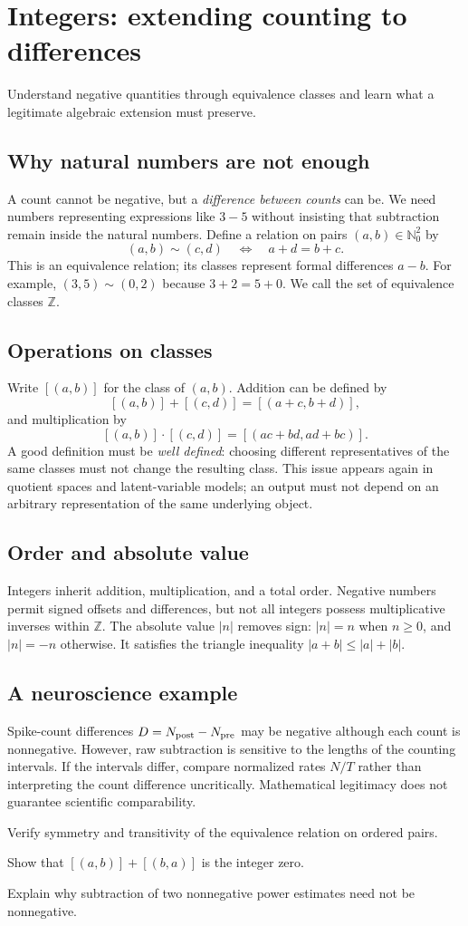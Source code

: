 \chapter{Integers: extending counting to differences}\label{ch:integers}
\begin{readergoal}Understand negative quantities through equivalence classes and learn what a legitimate algebraic extension must preserve.\end{readergoal}
\section{Why natural numbers are not enough}
A count cannot be negative, but a \emph{difference between counts} can be. We need numbers representing expressions like $3-5$ without insisting that subtraction remain inside the natural numbers. Define a relation on pairs $(a,b)\in\mathbb N_0^2$ by
\[(a,b)\sim(c,d)\quad\Longleftrightarrow\quad a+d=b+c.\]
This is an equivalence relation; its classes represent formal differences $a-b$. For example, $(3,5)\sim(0,2)$ because $3+2=5+0$. We call the set of equivalence classes $\mathbb Z$.

\section{Operations on classes}
Write $[(a,b)]$ for the class of $(a,b)$. Addition can be defined by
\[[(a,b)]+[(c,d)]=[(a+c,b+d)],\]
and multiplication by
\[[(a,b)]\cdot[(c,d)]=[(ac+bd,ad+bc)].\]
A good definition must be \emph{well defined}: choosing different representatives of the same classes must not change the resulting class. This issue appears again in quotient spaces and latent-variable models; an output must not depend on an arbitrary representation of the same underlying object.

\section{Order and absolute value}
Integers inherit addition, multiplication, and a total order. Negative numbers permit signed offsets and differences, but not all integers possess multiplicative inverses within $\mathbb Z$. The absolute value $|n|$ removes sign: $|n|=n$ when $n\ge0$, and $|n|=-n$ otherwise. It satisfies the triangle inequality $|a+b|\le|a|+|b|$.

\section{A neuroscience example}
Spike-count differences $D=N_{\rm post}-N_{\rm pre}$ may be negative although each count is nonnegative. However, raw subtraction is sensitive to the lengths of the counting intervals. If the intervals differ, compare normalized rates $N/T$ rather than interpreting the count difference uncritically. Mathematical legitimacy does not guarantee scientific comparability.

\begin{exercises}
\item Verify symmetry and transitivity of the equivalence relation on ordered pairs.
\item Show that $[(a,b)]+[(b,a)]$ is the integer zero.
\item Explain why subtraction of two nonnegative power estimates need not be nonnegative.
\end{exercises}
